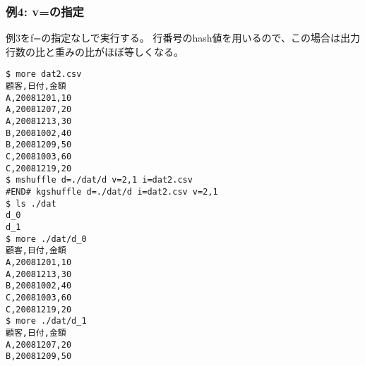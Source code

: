 \subsubsection*{例4: v=の指定}

例3をf=の指定なしで実行する。
行番号のhash値を用いるので、この場合は出力行数の比と重みの比がほぼ等しくなる。


\begin{Verbatim}[baselinestretch=0.7,frame=single]
$ more dat2.csv
顧客,日付,金額
A,20081201,10
A,20081207,20
A,20081213,30
B,20081002,40
B,20081209,50
C,20081003,60
C,20081219,20
$ mshuffle d=./dat/d v=2,1 i=dat2.csv
#END# kgshuffle d=./dat/d i=dat2.csv v=2,1
$ ls ./dat
d_0
d_1
$ more ./dat/d_0
顧客,日付,金額
A,20081201,10
A,20081213,30
B,20081002,40
C,20081003,60
C,20081219,20
$ more ./dat/d_1
顧客,日付,金額
A,20081207,20
B,20081209,50
\end{Verbatim}
